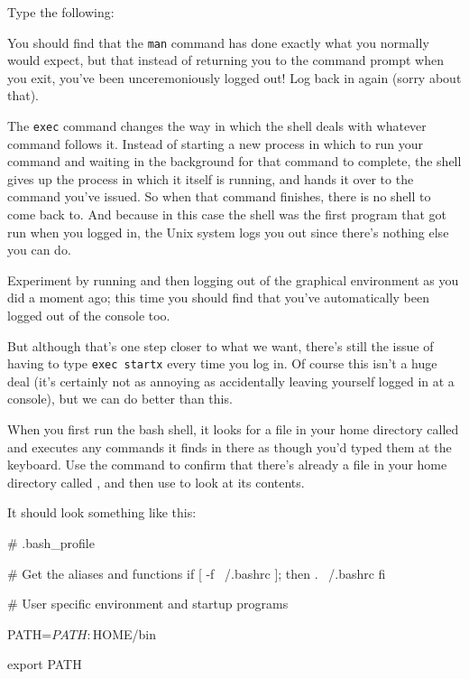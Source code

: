 Type the following:


You should find that the \texttt{man} command has done exactly what you normally would expect, but that instead of returning you to the command prompt when you exit, you've been unceremoniously logged out! Log back in again (sorry about that). 

The \texttt{exec} command changes the way in which the shell deals with whatever command follows it. Instead of starting a new process in which to run your command and waiting in the background for that command to complete, the shell gives up the process in which it itself is running, and hands it over to the command you've issued. So when that command finishes, there is no shell to come back to. And because in this case the shell was the first program that got run when you logged in, the Unix system logs you out since there's nothing else you can do. 

Experiment by running  and then logging out of the graphical environment as you did a moment ago; this time you should find that you've automatically been logged out of the console too.

But although that's one step closer to what we want, there's still the issue of having to type \texttt{exec startx} every time you log in. Of course this isn't a huge deal (it's certainly not as annoying as accidentally leaving yourself logged in at a console), but we can do better than this. 

When you first run the bash shell, it looks for a file in your home directory called  and executes any commands it finds in there as though you'd typed them at the keyboard. Use the  command to confirm that there's already a file in your home directory called , and then use  to look at its contents.

It should look something like this:

\begin{ttoutenv}
# .bash_profile

# Get the aliases and functions
if [ -f ~/.bashrc ]; then
	. ~/.bashrc
fi

# User specific environment and startup programs

PATH=$PATH:$HOME/bin

export PATH
\end{ttoutenv}

